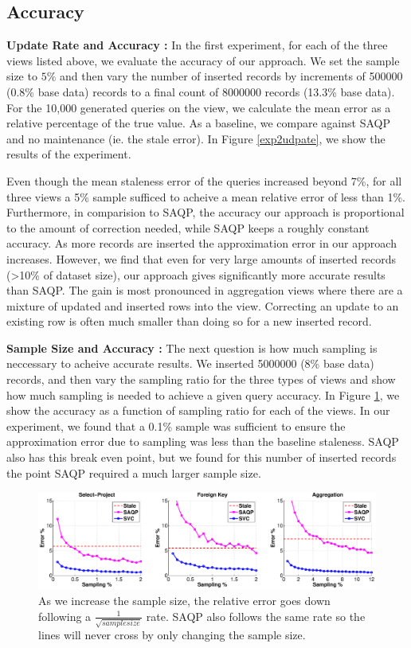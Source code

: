 \subsection{Accuracy}

{\noindent \bf Update Rate and Accuracy :}
In the first experiment, for each of the three views listed above, we evaluate the accuracy of our approach.
We set the sample size to $5\%$ and then vary the number of inserted records by increments of 500000 (0.8\% base data) records to a final count of 8000000 records (13.3\% base data).
For the 10,000 generated queries on the view, we calculate the mean error as a relative percentage of the true value.
As a baseline, we compare against SAQP and no maintenance (ie. the stale error).
In Figure \ref{exp2udpate}, we show the results of the experiment. 

Even though the mean staleness error of the queries increased beyond 7\%, for all three views a 5\% sample sufficed to acheive a mean relative error of less than 1\%.
Furthermore, in comparision to SAQP, the accuracy our approach is proportional to the amount of correction needed, while SAQP keeps a roughly constant accuracy.
As more records are inserted the approximation error in our approach increases.
However, we find that even for very large amounts of inserted records (>10\% of dataset size), our approach gives significantly more accurate results
than SAQP.
The gain is most pronounced in aggregation views where there are a mixture of updated and inserted rows into the view.
Correcting an update to an existing row is often much smaller than doing so for a new inserted record.

{\noindent \bf Sample Size and Accuracy :} The next question is how much sampling is neccessary to acheive accurate results.
We inserted 5000000 (8\% base data) records, and then vary the sampling ratio for the three types of views and show how much sampling is needed to achieve a given query accuracy.
In Figure \ref{exp1sample}, we show the accuracy as a function of sampling ratio for each of the views.
In our experiment, we found that a 0.1\% sample was sufficient to ensure the approximation error due to sampling was less than the baseline staleness.
SAQP also has this break even point, but we found for this number of inserted records the point SAQP required a much larger sample size.

\begin{figure}[ht!]
\label{exp1sample}
\hspace{-4em}
 \includegraphics[scale=0.22]{exp/exp1-samplesize-accuracy.eps}
 \caption{As we increase the sample size, the relative error goes down following a $\frac{1}{\sqrt{samplesize}}$ rate. SAQP also follows the same rate so the lines will never cross by only changing the sample size.}
\end{figure}

